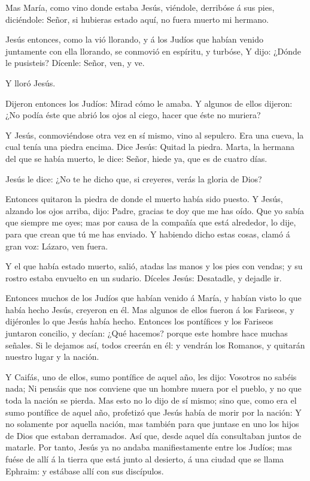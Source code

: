  Mas María, como vino donde estaba Jesús, viéndole,
derribóse á sus pies, diciéndole: Señor, si hubieras estado aquí, no
fuera muerto mi hermano.

 Jesús entonces, como la vió llorando, y á los Judíos que
habían venido juntamente con ella llorando, se conmovió en espíritu, y
turbóse,  Y dijo: ¿Dónde le pusisteis? Dícenle: Señor, ven,
y ve.

 Y lloró Jesús.

 Dijeron entonces los Judíos: Mirad cómo le amaba.
 Y algunos de ellos dijeron: ¿No podía éste que abrió los
ojos al ciego, hacer que éste no muriera?

 Y Jesús, conmoviéndose otra vez en sí mismo, vino al
sepulcro. Era una cueva, la cual tenía una piedra encima. 
Dice Jesús: Quitad la piedra. Marta, la hermana del que se había muerto,
le dice: Señor, hiede ya, que es de cuatro días.

 Jesús le dice: ¿No te he dicho que, si creyeres, verás la
gloria de Dios?

 Entonces quitaron la piedra de donde el muerto había sido
puesto. Y Jesús, alzando los ojos arriba, dijo: Padre, gracias te doy
que me has oído.  Que yo sabía que siempre me oyes; mas por
causa de la compañía que está alrededor, lo dije, para que crean que tú
me has enviado.  Y habiendo dicho estas cosas, clamó á gran
voz: Lázaro, ven fuera.

 Y el que había estado muerto, salió, atadas las manos y
los pies con vendas; y su rostro estaba envuelto en un sudario. Díceles
Jesús: Desatadle, y dejadle ir.

 Entonces muchos de los Judíos que habían venido á María, y
habían visto lo que había hecho Jesús, creyeron en él.  Mas
algunos de ellos fueron á los Fariseos, y dijéronles lo que Jesús había
hecho.  Entonces los pontífices y los Fariseos juntaron
concilio, y decían: ¿Qué hacemos? porque este hombre hace muchas
señales.  Si le dejamos así, todos creerán en él: y vendrán
los Romanos, y quitarán nuestro lugar y la nación.

 Y Caifás, uno de ellos, sumo pontífice de aquel año, les
dijo: Vosotros no sabéis nada;  Ni pensáis que nos conviene
que un hombre muera por el pueblo, y no que toda la nación se pierda.
 Mas esto no lo dijo de sí mismo; sino que, como era el
sumo pontífice de aquel año, profetizó que Jesús había de morir por la
nación:  Y no solamente por aquella nación, mas también
para que juntase en uno los hijos de Dios que estaban derramados.
 Así que, desde aquel día consultaban juntos de matarle.
 Por tanto, Jesús ya no andaba manifiestamente entre los
Judíos; mas fuése de allí á la tierra que está junto al desierto, á una
ciudad que se llama Ephraim: y estábase allí con sus discípulos.

